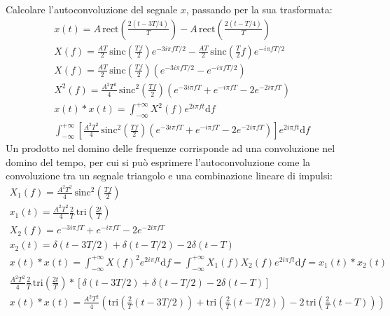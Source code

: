 \documentclass{article}
\newcommand{\rect}{\mbox{rect}}
\newcommand{\sinc}{\mbox{sinc}}
\newcommand{\df}{\mathrm{d}}
\begin{document}
Calcolare l'autoconvoluzione del segnale $x$, passando per la sua trasformata: 
\begin{gather*}
    x(t)=A\,\rect\displaystyle\left(\frac{2(t-3T/4)}{T}\right)-A\,\rect\displaystyle\left(\frac{2(t-T/4)}{T}\right)\\
    X(f)=\displaystyle\frac{AT}{2}\,\sinc\left(\frac{Tf}{2}\right)e^{-3i\pi fT/2}-\displaystyle\frac{AT}{2}\,\sinc\left(\frac{T}{2}f\right)e^{-i\pi fT/2}\\
    X(f)=\displaystyle\frac{AT}{2}\,\sinc\left(\frac{Tf}{2}\right)\left(e^{-3i\pi fT/2}-e^{-i\pi fT/2}\right)\\
    X^2(f)=\displaystyle\frac{A^2T^2}{4}\,\sinc^2\left(\frac{Tf}{2}\right)\left(e^{-3i\pi fT}+e^{-i\pi fT}-2e^{-2i\pi fT}\right)\\
    x(t)*x(t)=\displaystyle\int_{-\infty}^{+\infty}X^2(f)e^{2i\pi ft}\df f\\
    \displaystyle\int_{-\infty}^{+\infty}\left[\frac{A^2T^2}{4}\,\sinc^2\left(\frac{Tf}{2}\right)\left(e^{-3i\pi fT}+e^{-i\pi fT}-2e^{-2i\pi fT}\right)\right]e^{2i\pi ft}\df f
\end{gather*}
Un prodotto nel domino delle frequenze corrisponde ad una convoluzione nel domino del tempo, per cui si può esprimere l'autoconvoluzione come la convoluzione tra un segnale 
triangolo e una combinazione lineare di impulsi:
\begin{gather*}
    X_1(f)=\displaystyle\frac{A^2T^2}{4}\,\sinc^2\left(\frac{Tf}{2}\right)\\
    x_1(t)=\displaystyle\frac{A^2T^2}{4}\frac{2}{T}\,\mbox{tri}\left(\frac{2t}{T}\right)\\
    X_2(f)=e^{-3i\pi fT}+e^{-i\pi fT}-2e^{-2i\pi fT}\\
    x_2(t)=\delta(t-3T/2)+\delta(t-T/2)-2\delta(t-T)\\
    x(t)*x(t)=\displaystyle\int_{-\infty}^{+\infty}X(f)^2e^{2i\pi ft}\df f=\int_{-\infty}^{+\infty}X_1(f)X_2(f)e^{2i\pi ft}\df f=x_1(t)*x_2(t)\\
    \displaystyle\frac{A^2T^2}{4}\frac{2}{T}\,\mbox{tri}\left(\frac{2t}{T}\right)*\left[\delta(t-3T/2)+\delta(t-T/2)-2\delta(t-T)\right]
\end{gather*}
\begin{gather}
    x(t)*x(t)=\displaystyle\frac{A^2T^2}{4}\left(\mbox{tri}\left(\frac{2}{T}(t-3T/2)\right)+\mbox{tri}\left(\frac{2}{T}(t-T/2)\right)-2\,\mbox{tri}\left(\frac{2}{T}(t-T)\right)\right)
\end{gather}
\end{document}
